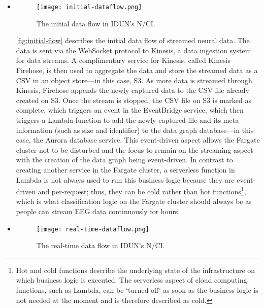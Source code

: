 \begin{itemize}
  \item  \begin{figure}[!ht]
          \centering
          \hspace*{0.4in}
          \texttt{[image: initial-dataflow.png]}
          \caption{The initial data flow in IDUN's N/CI.}
          \label{fig:initial-flow}
        \end{figure}

        \autoref{fig:initial-flow} describes the initial data flow of streamed neural data. The data is sent via the WebSocket protocol to Kinesis, a data ingestion system for data streams. A complimentary service for Kinesis, called Kinesis Firehose, is then used to aggregate the data and store the streamed data as a CSV in an object store—in this case, S3. As more data is streamed through Kinesis, Firehose appends the newly captured data to the CSV file already created on S3. Once the stream is stopped, the CSV file on S3 is marked as complete, which triggers an event in the EventBridge service, which then triggers a Lambda function to add the newly captured file and its meta- information (such as size and identifier) to the data graph database—in this case, the Aurora database service. This event-driven aspect allows the Fargate cluster not to be disturbed and the focus to remain on the streaming aspect with the creation of the data graph being event-driven. In contrast to creating another service in the Fargate cluster, a serverless function in Lambda is not always used to run this business logic because they are event-driven and per-request; thus, they can be cold rather than hot functions\footnote{Hot and cold functions describe the underlying state of the infrastructure on which business logic is executed. The serverless aspect of cloud computing functions, such as Lambda, can be ‘turned off’ as soon as the business logic is not needed at the moment and is therefore described as cold.}, which is what classification logic on the Fargate cluster should always be as people can stream EEG data continuously for hours.

  \item  \begin{figure}[!ht]
          \centering
          \hspace*{0.4in}
          \texttt{[image: real-time-dataflow.png]}
          \caption{The real-time data flow in IDUN's N/CI.}
          \label{fig:realtime-flow}
        \end{figure}


\end{itemize}
